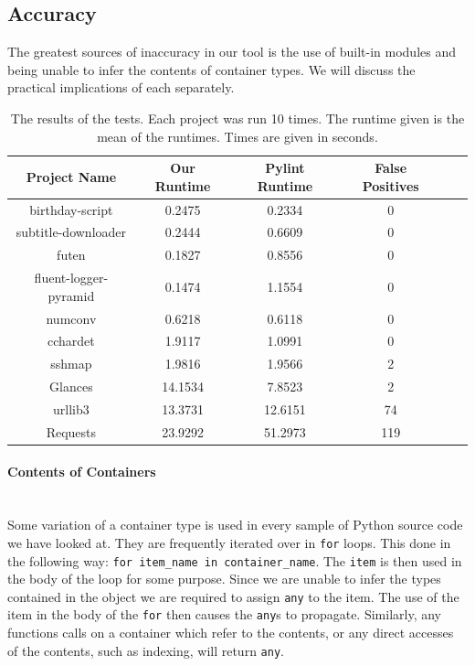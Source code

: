 \documentclass[12pt, titlepage]{article}
\begin{document}
\subsection{Accuracy}
The greatest sources of inaccuracy in our tool is the use of built-in modules and being unable to infer the contents of container types. We will discuss the practical implications of each separately.

    	\begin{table}
	\centering
    \begin{tabular}{ | c | c | c | c | c | c |}
    \hline
    \textbf{Project Name} & \textbf{Our Runtime} & \textbf{Pylint Runtime} & \textbf{False Positives} \\ \hline
    birthday-script & 0.2475 & 0.2334 & 0 \\ \hline
    subtitle-downloader & 0.2444 & 0.6609 & 0 \\ \hline
    futen & 0.1827 & 0.8556 & 0 \\ \hline
    fluent-logger-pyramid & 0.1474 & 1.1554 & 0 \\ \hline
    numconv & 0.6218 & 0.6118 & 0 \\ \hline
    cchardet &  1.9117 & 1.0991 & 0  \\ \hline
    sshmap & 1.9816 & 1.9566 & 2 \\ \hline
    Glances & 14.1534  & 7.8523 & 2 \\ \hline
    urllib3 & 13.3731  & 12.6151 & 74 \\ \hline
    Requests & 23.9292  & 51.2973 & 119 \\ \hline
    \end{tabular}
    \caption{The results of the tests. Each project was run 10 times. The runtime given is the mean of the runtimes. Times are given in seconds.}
	\label{table:toolResults}
    \end{table}

\paragraph*{Contents of Containers}\mbox{}\\
Some variation of a container type is used in every sample of Python source code we have looked at. They are frequently iterated over in \texttt{for} loops. This done in the following way: \texttt{for item\_name in container\_name}. The \texttt{item} is then used in the body of the loop for some purpose. Since we are unable to infer the types contained in the object we are required to assign \texttt{any} to the item. The use of the item in the body of the \texttt{for} then causes the \texttt{any}s to propagate. Similarly, any functions calls on a container which refer to the contents, or any direct accesses of the contents, such as indexing, will return \texttt{any}.
\end{document}

